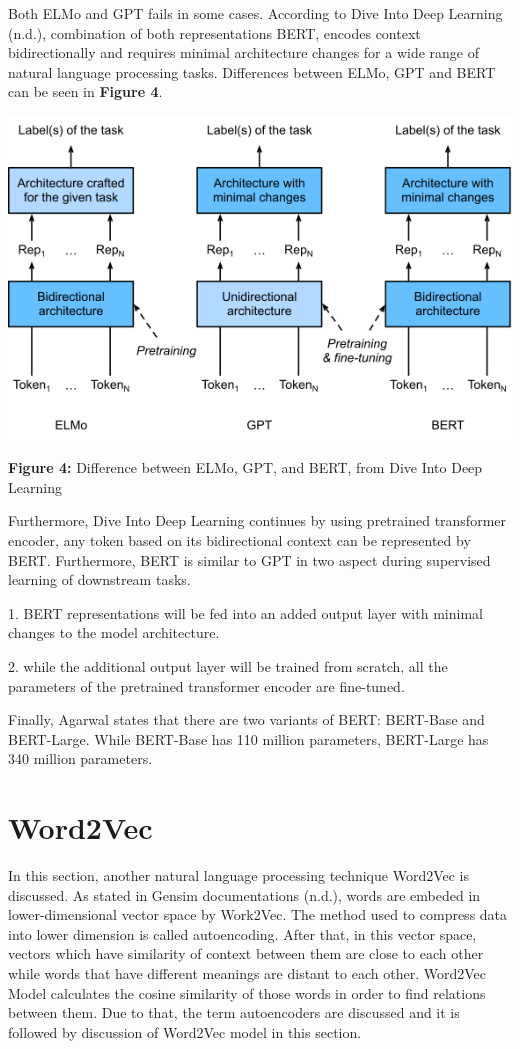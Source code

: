 \documentclass[man]{apa7}
\begin{document}
Both ELMo and GPT fails in some cases. According to Dive Into Deep Learning (n.d.), combination of both representations BERT, encodes context bidirectionally and requires minimal architecture changes for a wide range of natural language processing tasks. Differences between ELMo, GPT and BERT can be seen in \textbf{Figure 4}.
\\[2\baselineskip]

\begin{center}
\includegraphics[scale=0.6]{elmo-gpt-bert.png}

\textbf{Figure 4:} Difference between ELMo, GPT, and BERT, from Dive Into Deep Learning\\[2\baselineskip]
\end{center}

Furthermore, Dive Into Deep Learning continues by using pretrained transformer encoder, any token based on its bidirectional context can be represented by BERT. Furthermore, BERT is similar to GPT in two aspect during supervised learning of downstream tasks.

1. BERT representations will be fed into an added output layer with minimal changes to the model architecture. 

2. while the additional output layer will be trained from scratch, all the parameters of the pretrained transformer encoder are fine-tuned.

Finally, Agarwal states that there are two variants of BERT: BERT-Base and BERT-Large. While BERT-Base has 110 million parameters, BERT-Large has 340 million parameters.

\section{Word2Vec}
In this section, another natural language processing technique Word2Vec is discussed. As stated in Gensim documentations (n.d.), words are embeded in lower-dimensional vector space by Work2Vec. The method used to compress data into lower dimension is called autoencoding. After that, in this vector space, vectors which have similarity of context between them are close to each other while words that have different meanings are distant to each other. Word2Vec Model calculates the cosine similarity of those words in order to find relations between them. Due to that, the term autoencoders are discussed and it is followed by discussion of Word2Vec model in this section.
\end{document}
